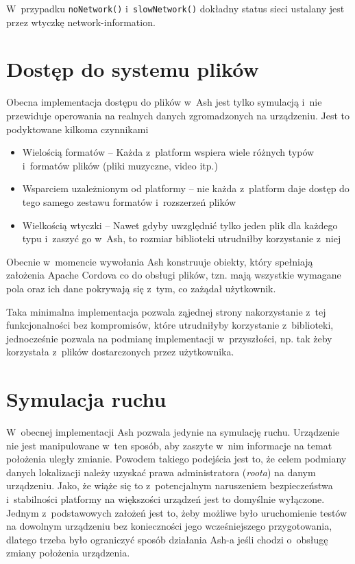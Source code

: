 \documentclass[brudnopis]{xmgr}
\begin{document}
W~przypadku \texttt{noNetwork()} i~\texttt{slowNetwork()} dokładny status sieci ustalany jest przez wtyczkę network-information.

\section{Dostęp do systemu plików}

Obecna implementacja dostępu do plików w~Ash jest tylko symulacją i~nie przewiduje operowania na realnych danych zgromadzonych na urządzeniu. Jest to podyktowane kilkoma czynnikami

\begin{itemize}
  \item Wielością formatów -- Każda z~platform wspiera wiele różnych typów i~formatów plików (pliki muzyczne, video itp.) 
  \item Wsparciem uzależnionym od platformy -- nie każda z~platform daje dostęp do tego samego zestawu formatów i~rozszerzeń plików
  \item Wielkością wtyczki -- Nawet gdyby uwzględnić tylko jeden plik dla każdego typu i~zaszyć go w~Ash, to rozmiar biblioteki utrudniłby korzystanie z~niej
\end{itemize}

Obecnie w~momencie wywołania Ash konstruuje obiekty, który spełniają założenia Apache Cordova co do obsługi plików, tzn. mają wszystkie wymagane pola oraz ich dane pokrywają się z~tym, co zażądał użytkownik. 

Taka minimalna implementacja pozwala ząjednej strony  nakorzystanie z~tej funkcjonalności bez kompromisów, które utrudniłyby korzystanie z~biblioteki, jednocześnie pozwala na podmianę implementacji w~przyszłości, np. tak żeby korzystała z~plików dostarczonych przez użytkownika.

\section{Symulacja ruchu}

W~obecnej implementacji Ash pozwala jedynie na symulację ruchu. Urządzenie nie jest manipulowane w~ten sposób, aby zaszyte w~nim informacje na temat położenia uległy zmianie. Powodem takiego podejścia jest to, że celem podmiany danych lokalizacji należy uzyskać prawa administratora (\textit{roota}) na danym urządzeniu. Jako, że wiąże się to z~potencjalnym naruszeniem bezpieczeństwa i~stabilności platformy na większości urządzeń jest to domyślnie wyłączone. Jednym z~podstawowych założeń jest to, żeby możliwe było uruchomienie testów na dowolnym urządzeniu bez konieczności jego wcześniejszego przygotowania, dlatego trzeba było ograniczyć sposób działania Ash-a jeśli chodzi o~obsługę zmiany położenia urządzenia. 
\end{document}
